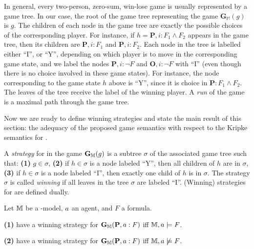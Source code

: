 In general, every two-person, zero-sum, win-lose game is usually represented by
a game tree. In our
case, the root of the game tree representing the game
$\mathbf{G}_\mathbb{M}(g)$ is $g$. The children of each node in the game tree
are exactly the possible choices of the corresponding player. For instance, if
$h=\mathbf{P},  i :  F _1\wedge  F _2$ appears in the game tree, then its
children are $\mathbf{P}, i : F _1$ and $\mathbf{P}, i : F _2$. Each node in
the tree is labelled either ``I'', or ``Y'', depending on which player is to
move in the corresponding game state, and we label 
the nodes  $\mathbf{P},  i : \neg  F $ and $\mathbf{O},  i :
\neg  F $ with ``I'' (even though there is no choice involved in these game
states). For instance, the node corresponding to the game state $h$ above is
``Y'', since it is \Your choice in $\mathbf{P}: F _1\wedge  F _2$. The leaves
of the tree receive the label of the winning player. 
A \emph{run} of the game is a maximal path through the game tree.

Now we are ready to define winning strategies and state the main result of this section:
the adequacy of the proposed game semantics with respect to the Kripke semantics for \PNL.

\begin{definition}
    A \emph{strategy} for \Me in the game $\mathbf{G}_{\mathbb{M}}(g)$ is a subtree $\sigma$ of the associated game tree such that: 
 \textbf{(1)} $g\in \sigma$,
 \textbf{(2)} if $h\in \sigma$ is a node labeled ``Y'', then all children of $h$ are in $\sigma$,
 \textbf{(3)} if $h\in \sigma$ is a node labeled ``I'', then exactly one child of $h$ is in $\sigma$.
The strategy $\sigma$ is called \emph{winning} if all leaves in the tree $\sigma$ are labeled ``I''. (Winning) strategies for \You are defined dually.
\end{definition}

\begin{theorem}%
\label{th:adequacy}
Let $\mathbb{M}$ be a \PNL-model, $\ag$ an agent, and $F$ a formula.

\noindent\textbf{(1)} \Ic have a winning strategy for $\mathbf{G}_\M(\mathbf{P}, \ag:F)$ iff $\M,\ag \models F$. 

\noindent\textbf{(2)} \You have a winning strategy for $\mathbf{G}_{\M}(\mathbf{P}, \ag:F)$ iff $\M,\ag\not \models F$.
\end{theorem}

